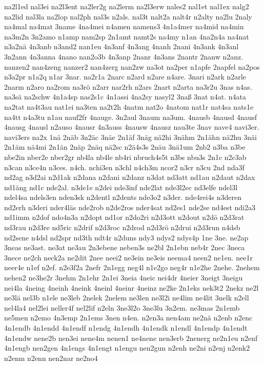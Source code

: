 {na2l1ed
nal3ei
na2l3ent
na2ler2g
na2lerm
na2l3erw
nales2
nal1et
nal1ex
nalg2
na2lid
nal3la
na2lop
nal2ph
nal3s
n2als.
nal3t
nalt2a
nalt4r
n2alty
na2lu
2naly
na4mal
na4mat
3name
4na4mei
n4amen
namens3
4n1a4mer
na4mid
na4min
na3m2n
3n2amo
n1amp
nam2sp
2n1amt
namt2s
na4my
n1an
4na2n4a
na4nat
n3a2nä
4n3anb
n3and2
nan1eu
4n3anf
4n3ang
4nanh
2nani
4n3ank
4n3anl
3n2ann
4n3anna
4nano
nan2o3b
4n3anp
2nanr
4n3ans
2nantr
2nanw
n2anz.
nanzen2
nan4zeng
nanzer2
nan4zerg
nan2zw
na3ot
na2per
n1apfe
2napfel
na2pos
n3a2pr
n1a2q
n1ar
3nar.
na2r1a
2narc
n2ard
n2are
n4are.
3nari
n2ark
n2arle
2narm
n2aro
na2rom
na3rö
n2arr
nar2rh
n2ars
2nart
n2arta
na3r2u
3nas
n4as.
na3sä
na2schw
4n1a4sp
nas2s1c
4n1assi
4na2sy
nasyl2
3naß
3nat
n4at.
n4ata
na2tat
na4t3au
nat1ei
na3ten
na2t2h
4natm
nat2o
4natom
nat1r
nat4sa
nats1e
na4tt
n4a3tu
n1au
nauf2fr
4nauge.
3n2aul
3naum
na3um.
4nausb
4nausd
4nausf
4nausg
4nausl
n2auso
4nausr
4n3auss
4nausw
4nausz
nau3te
3nav
nave4
navi3er.
navi3ers
na2x
1nä
2näb
3n2äc
3näe
2n1äf
3näg
nä2hi
3nähm
2n1ähn
nä2hu
3näi
2n1äm
nä4mi
2n1än
2näp
2näq
nä2sc
n2ä4s3s
2näu
3nä1um
2nb2
n3ba
n3be
nbe2in
nber2e
nber2gr
nb4la
nb4le
nb4ri
nbruch4s5t
n3bs
nbu3s
2n1c
n2c3ab
n3can
n3ce4n
n3ces.
n4ch.
nchi3en
n3chl
n4ch3m
ncor2
n3cr
n3cu
2nd
nda3f
nd2ag
n3d2ai
n2d1ak
n2dana
n2dani
n2danz
n3dat
nd3att
nd1au
n2daut
n2dax
nd1äng
nd1c
nde2al.
n3de1e
n2dei
nde3inf
nde2lat
nde3l2ec
nd3elfe
ndel3l
ndel4sa
ndels3en
nden3sk
n2dentl
n2dents
nde3o2
n3der.
nde4rei4s
n3deren
nd2erh
n3deri
nder4läs
nde2rob
n2de2ros
nder4sat
nd2es1
nde2se
nd4est
ndi2a3
nd1imm
n2dof
ndo4n3a
n2dopt
nd1or
n2do2ri
n2d3ott
n2dout
n2dö
n2d3rat
nd3rau
n2d3re
nd5ric
n2drif
n2d3roc
n2drod
n2d3rö
n2drui
n2d3run
n4dsb
nd2sene
n4dsl
nd2spr
nd3th
ndt4r
n2duns
ndy3
ndys2
ndys4p
1ne
3ne.
ne2ap
3neas
ne3ast.
ne3at
ne3au
2n3ebene
neben3s
ne2bl
2n1ebn
neb4r
2nec
3neca
3nece
ne2ch
neck2a
ne2dit
2nee
neei2
ne3ein
ne3eis
neema4
neen2
ne1en.
nee1r
neer4e
n1ef
n2ef.
n2e3f2a
2nefr
2n1egg
neg4l
n1e2go
neg4r
n1e2he
2nehe.
2nehem
nehen2
ne3he2r
3nehm
2n1ehr
2n1ei
3neia
4neic
nei4dr
4neier
3neigt
3neigu
nei4la
4neing
4neinh
4neink
4neinl
4neinr
4neinz
ne2ke
2n1eks
nek3t2
2nekz
ne2l
ne3lä
nel3b
n1ele
ne3leb
2nelek
2nelem
ne3len
ne3l2i
ne4lim
ne4lit
3nelk
n2ell
nel4la4
nel2lei
neller4f
nel2lif
n2eln
3ne3l2o
3ne3lu
3n2em.
ne3mas
2n1emb
ne5men
n2emo
4n3emp
2n1ems
3nen
n4en.
n2en3a
nen4am
ne2nä
n2enb
n2enc
4n1endb
4n1endd
4n1endf
n1endg
4n1endh
4n1endk
n1endl
4n1endp
4n1endt
4n1endw
nene2b
nen3ei
nene4m
nenen1
ne4nene
nen3erb
2nenerg
ne2n1eu
n2enf
4n1engb
nen2gen
4n1engs
4n1engt
n1engu
nen2gun
n2enh
ne2ni
n2enj
n2enk2
n2enm
n2enn
nen2nar
ne2no4
}
